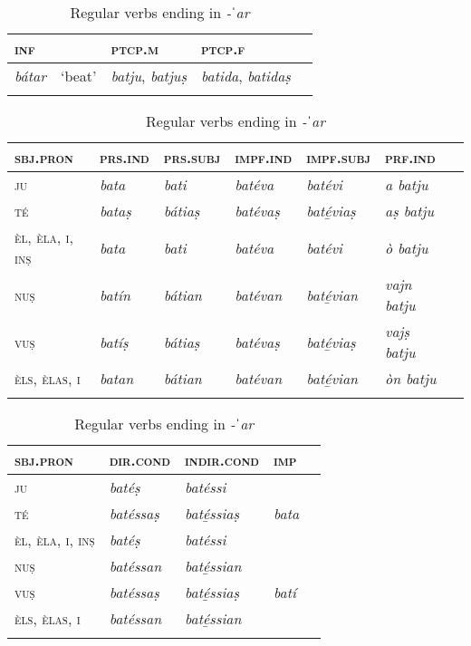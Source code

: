 \begin{table}
	\caption{Regular verbs ending in \textit{-ˈar}}
	\label{conjar1}
	\begin{tabularx}{.7\textwidth}{p{}llll}
		
		\lsptoprule
		\textsc{inf} & & \textsc{ptcp.m}  & \textsc{ptcp.f}\\
		\midrule
		\textit{bátar} & `beat' & \textit{batju}, \textit{batjuṣ} & \textit{batida}, \textit{batidaṣ}\\
		\lspbottomrule  
	\end{tabularx}
	
	\medskip
	
	\begin{tabularx}{\textwidth}{p{}llllll}
		\lsptoprule
		\textsc{sbj.pron} &\textsc{prs.ind} &\textsc{prs.subj} &\textsc{impf.ind} & \textsc{impf.subj} &\textsc{prf.ind}\\
		\midrule
		\textsc{ju} & \textit{bata} & \textit{bati} & \textit{batéva} & \textit{batévi} &  \textit{a batju}\\
		\textsc{té} & \textit{bataṣ} & \textit{bátiaṣ} & \textit{batévaṣ} & \textit{baté̱viaṣ} & \textit{aṣ batju}\\
		\textsc{èl, èla, i, inṣ} & \textit{bata} & \textit{bati} & \textit{batéva}  & \textit{batévi} & \textit{ò batju}\\
		\textsc{nuṣ} & \textit{batín} & \textit{bátian} & \textit{batévan} & \textit{baté̱vian} & \textit{vajn batju}\\
		\textsc{vuṣ} & \textit{batíṣ} & \textit{bátiaṣ} &  \textit{batévaṣ} & \textit{baté̱viaṣ} & \textit{vajṣ batju} \\
		\textsc{èls, èlas, i} & \textit{batan} & \textit{bátian} & \textit{batévan} & \textit{baté̱vian} & \textit{òn batju} \\
		\lspbottomrule
	\end{tabularx}
	
	\medskip
	
	\begin{tabularx} {\textwidth}{p{2cm}XXXX}
		\lsptoprule
		\textsc{sbj.pron} &\textsc{dir.cond} &  \textsc{indir.cond}    &\textsc{imp}\\
		\midrule
		\textsc{ju} & \textit{batéṣ} & \textit{batéssi} \\
		\textsc{té} & \textit{batéssaṣ} & \textit{baté̱ssiaṣ} & \textit{bata}\\
		\textsc{èl, èla, i, inṣ} & \textit{batéṣ} & \textit{batéssi}\\
		\textsc{nuṣ} & \textit{batéssan} & \textit{baté̱ssian} \\
		\textsc{vuṣ} & \textit{batéssaṣ} & \textit{baté̱ssiaṣ} & \textit{batí} \\
		\textsc{èls, èlas, i} & \textit{batéssan} & \textit{baté̱ssian}\\
		\lspbottomrule
	\end{tabularx} 
\end{table}

